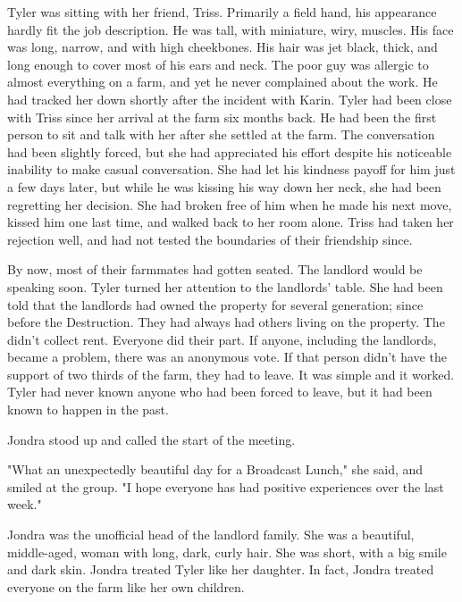 \documentclass[12pt,novel,nonsubmission,smart]{sffms}
\begin{document}
Tyler was sitting with her friend, Triss. Primarily a field hand, his appearance
hardly fit the job description. He was tall, with miniature, wiry, muscles.
His face was long, narrow, and with high cheekbones. His hair was jet black,
thick, and long enough to cover most of his ears and neck. The poor guy was
allergic to almost everything on a farm, and yet he never complained about
the work. He had tracked her down shortly
after the incident with Karin. Tyler had been close with Triss since her arrival
at the farm six months back. He had been the first person to sit and talk with
her after she settled at the farm. The conversation had been slightly
forced, but she had appreciated his effort despite his noticeable inability
to make casual conversation. She had let his kindness payoff for him just a few days
later, but while he was kissing his way down her neck, she had been regretting
her decision. She had broken free of him when he made his next move,
kissed him one last time, and walked back to her room alone. Triss had
taken her rejection well, and had not tested the boundaries of their friendship since.

By now, most of their farmmates had gotten seated. The landlord would be speaking
soon. Tyler turned her attention to the landlords' table. She had been told that
the landlords had owned the
property for several generation; since before the Destruction. They had always
had others living on the property. The didn't collect rent. Everyone did their
part. If anyone, including the landlords, became a problem,
there was an anonymous vote. If that
person didn't have the support of two thirds of the farm, they had to leave.
It was simple and it worked. Tyler had never known anyone who had been
forced to leave, but it had been known to happen in the past.

Jondra stood up and called the start of the meeting.

"What an unexpectedly beautiful day for a Broadcast Lunch," she said, and smiled at the
group. "I hope everyone has had positive experiences over the last week."

Jondra was the unofficial head of the landlord family. She was a beautiful, middle-aged,
woman with long, dark, curly hair. She was short, with a big smile and dark
skin. Jondra treated Tyler like her daughter. In fact, Jondra treated everyone on
the farm like her own children.
\end{document}
